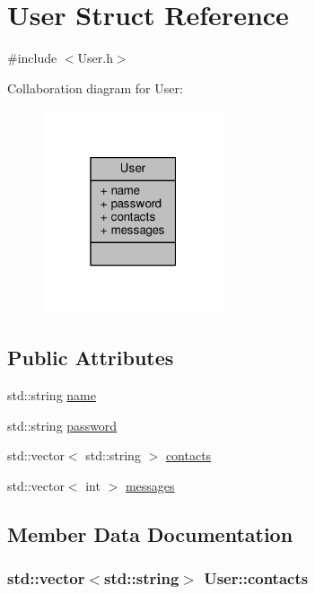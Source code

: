 \hypertarget{structUser}{}\section{User Struct Reference}
\label{structUser}


{\ttfamily \#include $<$User.\+h$>$}



Collaboration diagram for User\+:
\nopagebreak
\begin{figure}[H]
\begin{center}
\leavevmode
\includegraphics[width=151pt]{structUser__coll__graph}
\end{center}
\end{figure}
\subsection*{Public Attributes}
\begin{DoxyCompactItemize}
\item 
std\+::string \hyperlink{structUser_a085d8d69282b6298964eab8351584536}{name}
\item 
std\+::string \hyperlink{structUser_ac2f2e75b15e8eb6cbb030fc85a6cd59f}{password}
\item 
std\+::vector$<$ std\+::string $>$ \hyperlink{structUser_ab020b301809cbced04dd78f324fa3e2e}{contacts}
\item 
std\+::vector$<$ int $>$ \hyperlink{structUser_a1b194a13658a19f18233e0d5b102e295}{messages}
\end{DoxyCompactItemize}


\subsection{Member Data Documentation}
\subsubsection[{\texorpdfstring{contacts}{contacts}}]{\setlength{\rightskip}{0pt plus 5cm}std\+::vector$<$std\+::string$>$ User\+::contacts}\hypertarget{structUser_ab020b301809cbced04dd78f324fa3e2e}{}\label{structUser_ab020b301809cbced04dd78f324fa3e2e}

